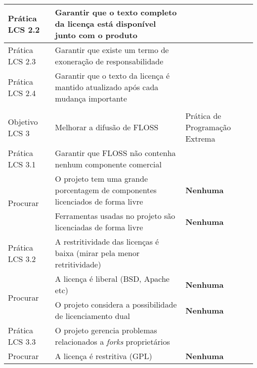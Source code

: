 \begin{longtable}{|p{2cm}|p{7cm}|p{7cm}|}
  \hline \cellcolor[gray]{0.9} Prática LCS 2.2 & \cellcolor[gray]{0.9}
  Garantir que o texto completo da licença está disponível junto com o
  produto & \\
  \hline \cellcolor[gray]{0.9} Prática LCS 2.3 & \cellcolor[gray]{0.9}
  Garantir que existe um termo de exoneração de responsabilidade & \\
  \hline \cellcolor[gray]{0.9} Prática LCS 2.4 & \cellcolor[gray]{0.9}
  Garantir que o texto da licença é mantido atualizado após cada
  mudança importante & \\
  \hline
  & & \\
  \hline \cellcolor[gray]{0.6} Objetivo LCS 3 & \cellcolor[gray]{0.6}
  Melhorar a difusão de FLOSS & Prática de Programação Extrema \\
  \hline \cellcolor[gray]{0.9} Prática LCS 3.1 & \cellcolor[gray]{0.9}
  Garantir que FLOSS não contenha nenhum componente comercial & \\
  \hline \multirow{2}{*}{Procurar} & O projeto tem uma grande
  porcentagem de componentes licenciados de forma livre &
  \textbf{Nenhuma} \\
  \cline{2-3} & Ferramentas usadas no projeto são licenciadas de forma
  livre & \textbf{Nenhuma} \\
  \hline \cellcolor[gray]{0.9} Prática LCS 3.2 & \cellcolor[gray]{0.9}
  A restritividade das licenças é baixa (mirar pela menor retritividade) & \\
  \hline \multirow{2}{*}{Procurar} & A licença é liberal (BSD, Apache
  etc) &  \textbf{Nenhuma} \\
  \cline{2-3} & O projeto considera a possibilidade de licenciamento
  dual & \textbf{Nenhuma} \\
  \hline \cellcolor[gray]{0.9} Prática LCS 3.3 & \cellcolor[gray]{0.9}
  O projeto gerencia problemas relacionados a \textit{forks} proprietários & \\
  \hline \multirow{1}{*}{Procurar} & A licença é restritiva (GPL) &
  \textbf{Nenhuma} \\
  \hline
\end{longtable}

